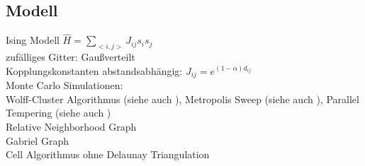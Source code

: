 \subsection{Modell}
    Ising Modell \(\hat{H} = \sum_{<i,j>}J_{ij}s_{i}s_{j}\)\\
    zufälliges Gitter: Gaußverteilt\\
    Kopplungskonstanten abstandsabhängig: \(J_{ij}=e^{(1-\alpha)d_{ij}}\)\\
    Monte Carlo Simulationen:\\
        Wolff-Cluster Algorithmus \cite{Wolff1989} (siehe auch \cite[S. xx]{NewmanBarkema1999}),
        Metropolis Sweep \cite{Metropolis1953} (siehe auch \cite[S. xx]{NewmanBarkema1999}),
        Parallel Tempering \cite{ParallelTempering1986} (siehe auch \cite[S. xx]{NewmanBarkema1999} \cite[S. xx]{Katzgraber2011})\\
    Relative Neighborhood Graph \cite{Toussaint1980}\\
    Gabriel Graph \cite{Gabriel1969}\\
        Cell Algorithmus ohne Delaunay Triangulation \cite{RNGCell}

\cite{NewmanBarkema1999}
